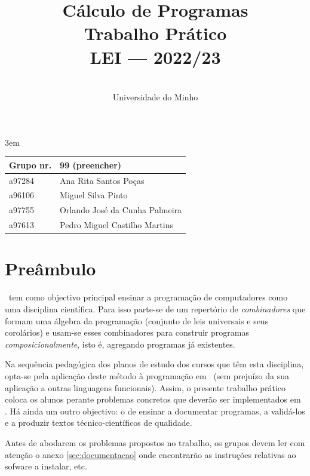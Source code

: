 \documentclass[a4paper]{article}
\title{
          \textbf{Cálculo de Programas}
\\
          Trabalho Prático
\\
          LEI --- 2022/23
}
\author{
          \dium
\\
          Universidade do Minho
}
\date\mydate
\begin{document}
\emergencystretch 3em

\maketitle

\begin{center}\large
\begin{tabular}{ll}
Grupo nr. & 99 (preencher)
\\\hline
a97284 & Ana Rita Santos Poças
\\
a96106 & Miguel Silva Pinto
\\
a97755 & Orlando José da Cunha Palmeira
\\
a97613 & Pedro Miguel Castilho Martins
\end{tabular}
\end{center}

\section*{Preâmbulo}

\CP\ tem como objectivo principal ensinar
a progra\-mação de computadores como uma disciplina científica. Para isso
parte-se de um repertório de \emph{combinadores} que formam uma álgebra da
programação (conjunto de leis universais e seus corolários) e usam-se esses
combinadores para construir programas \emph{composicionalmente}, isto é,
agregando programas já existentes.

Na sequência pedagógica dos planos de estudo dos cursos que têm
esta disciplina, opta-se pela aplicação deste método à programação
em \Haskell\ (sem prejuízo da sua aplicação a outras linguagens
funcionais). Assim, o presente trabalho prático coloca os
alunos perante problemas concretos que deverão ser implementados em
\Haskell.  Há ainda um outro objectivo: o de ensinar a documentar
programas, a validá-los e a produzir textos técnico-científicos de
qualidade.

Antes de abodarem os problemas propostos no trabalho, os grupos devem ler
com atenção o anexo \ref{sec:documentacao} onde encontrarão as instruções
relativas ao sofware a instalar, etc.
\end{document}

